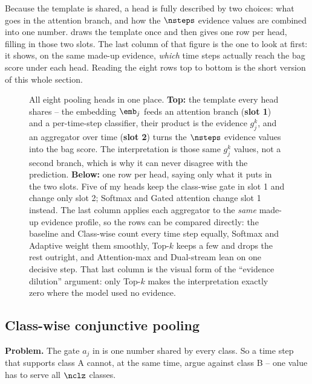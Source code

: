 Because the template is shared, a head is fully described by two choices: what goes in the attention
branch, and how the $\nsteps$ evidence values are combined into one number.  draws
the template once and then gives one row per head, filling in those two slots. The last column of
that figure is the one to look at first: it shows, on the same made-up evidence, \emph{which} time
steps actually reach the bag score under each head. Reading the eight rows top to bottom is the
short version of this whole section.

\begin{figure}[htbp]
  \centering
  
  \caption{All eight pooling heads in one place. \textbf{Top:} the template every head shares --
  the embedding $\emb_j$ feeds an attention branch (\textbf{slot 1}) and a per-time-step classifier,
  their product is the evidence $g_j^k$, and an aggregator over time (\textbf{slot 2}) turns the
  $\nsteps$ evidence values into the bag score. The interpretation is those same $g_j^k$ values, not
  a second branch, which is why it can never disagree with the prediction. \textbf{Below:} one row
  per head, saying only what it puts in the two slots. Five of my heads keep the class-wise gate in
  slot 1 and change only slot 2; Softmax and Gated attention change slot 1 instead. The last column
  applies each aggregator to the \emph{same} made-up evidence profile, so the rows can be compared
  directly: the baseline and Class-wise count every time step equally, Softmax and Adaptive weight
  them smoothly, Top-$k$ keeps a few and drops the rest outright, and Attention-max and Dual-stream
  lean on one decisive step. That last column is the visual form of the ``evidence dilution''
  argument: only Top-$k$ makes the interpretation exactly zero where the model used no evidence.}
  \label{fig:pooling}
\end{figure}

\subsection{Class-wise conjunctive pooling}
\label{sec:pool:classwise}

\textbf{Problem.} The gate $a_j$ in  is one number shared by every class. So a
time step that supports class A cannot, at the same time, argue against class B -- one value has to
serve all $\nclz$ classes.

